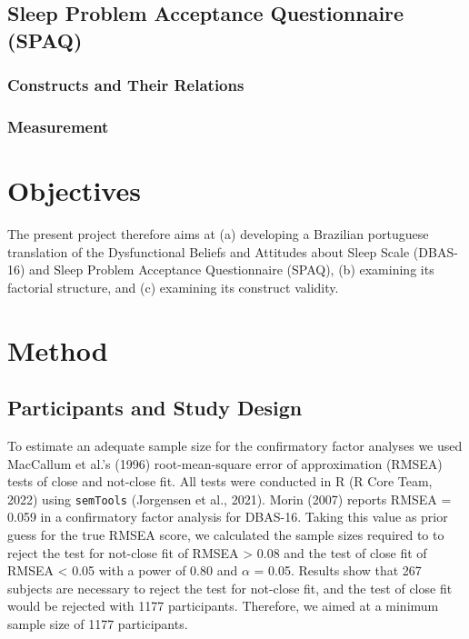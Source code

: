 \documentclass[
  ,doc,11pt, twoside,floatsintext]{apa6}
\begin{document}
\hypertarget{sleep-problem-acceptance-questionnaire-spaq}{%
\subsection{Sleep Problem Acceptance Questionnaire (SPAQ)}\label{sleep-problem-acceptance-questionnaire-spaq}}

\hypertarget{constructs-and-their-relations-1}{%
\subsubsection{Constructs and Their Relations}\label{constructs-and-their-relations-1}}

\hypertarget{measurement-1}{%
\subsubsection{Measurement}\label{measurement-1}}

\hypertarget{objectives}{%
\section{Objectives}\label{objectives}}

The present project therefore aims at (a) developing a Brazilian portuguese translation of the Dysfunctional Beliefs and Attitudes about Sleep Scale (DBAS-16) and Sleep Problem Acceptance Questionnaire (SPAQ), (b) examining its factorial structure, and (c) examining its construct validity.

\newpage

\hypertarget{method}{%
\section{Method}\label{method}}

\hypertarget{participants-and-study-design}{%
\subsection{Participants and Study Design}\label{participants-and-study-design}}

To estimate an adequate sample size for the confirmatory factor analyses we used MacCallum et al.'s (1996) root-mean-square error of approximation (RMSEA) tests of close and not-close fit. All tests were conducted in R (R Core Team, 2022) using \texttt{semTools} (Jorgensen et al., 2021). Morin (2007) reports RMSEA = 0.059 in a confirmatory factor analysis for DBAS-16. Taking this value as prior guess for the true RMSEA score, we calculated the sample sizes required to to reject the test for not-close fit of RMSEA \textgreater{} 0.08 and the test of close fit of RMSEA \textless{} 0.05 with a power of 0.80 and \(\alpha\) = 0.05. Results show that 267 subjects are necessary to reject the test for not-close fit, and the test of close fit would be rejected with 1177 participants. Therefore, we aimed at a minimum sample size of 1177 participants.
\end{document}

